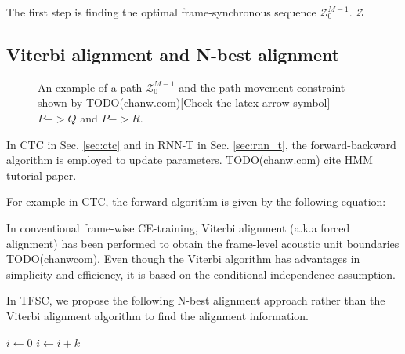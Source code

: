 \documentclass{article}
\begin{document}
The first step is finding the optimal frame-synchronous sequence
$\mathcal{Z}_0^{M-1}$.   
$\mathcal{Z}$

\begin{algorithmic}
\end{algorithmic}



\subsection{Viterbi alignment and N-best alignment}


\begin{figure}
  \centering
    \resizebox{100mm}{!}{
      
    } 
    \caption {
      An example of a path $\mathcal{Z}_{0}^{M-1}$ and the path movement 
      constraint shown by TODO(chanw.com)[Check the latex arrow symbol] $P -> Q$ and $P -> R$. 
      \label{fig:path_alignment}
    }
\end{figure}

In CTC in Sec. \ref{sec:ctc} and in RNN-T in Sec. \ref{sec:rnn_t}, the 
forward-backward algorithm is employed to update parameters. 
TODO(chanw.com) cite HMM tutorial paper.

For example in CTC, the forward algorithm is given by the following equation:



In conventional frame-wise CE-training, Viterbi alignment 
(a.k.a forced alignment) has been performed to obtain the frame-level 
acoustic unit  boundaries TODO(chanwcom). Even though the Viterbi algorithm
has advantages in simplicity and efficiency, it is based on
the conditional independence assumption.

In TFSC, we propose the following N-best alignment approach rather than
the Viterbi alignment algorithm to find the alignment information.

\begin{algorithmic}

	\EndFor
\EndFor

    \State $i\gets 0$
\Else
        \State $i\gets i+k$
    \EndIf
\EndIf
\label{algorithm:n_best_alignment}
\end{algorithmic}
\end{document}
